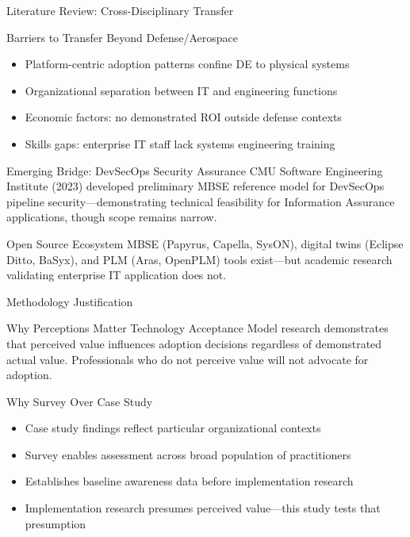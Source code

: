 \documentclass{beamer}
\begin{document}
\begin{frame}[allowframebreaks]{Literature Review: Cross-Disciplinary Transfer}
  \begin{block}{Barriers to Transfer Beyond Defense/Aerospace}
    \begin{itemize}
      \item Platform-centric adoption patterns confine DE to physical systems
      \item Organizational separation between IT and engineering functions
      \item Economic factors: no demonstrated ROI outside defense contexts
      \item Skills gaps: enterprise IT staff lack systems engineering training
    \end{itemize}
  \end{block}

  \begin{block}{Emerging Bridge: DevSecOps Security Assurance}
    CMU Software Engineering Institute (2023) developed preliminary MBSE reference model for DevSecOps pipeline security---demonstrating technical feasibility for Information Assurance applications, though scope remains narrow.
  \end{block}

  \begin{block}{Open Source Ecosystem}
    MBSE (Papyrus, Capella, SysON), digital twins (Eclipse Ditto, BaSyx), and PLM (Aras, OpenPLM) tools exist---but academic research validating enterprise IT application does not.
  \end{block}
\end{frame}

\begin{frame}[allowframebreaks]{Methodology Justification}
  \begin{block}{Why Perceptions Matter}
    Technology Acceptance Model research demonstrates that perceived value influences adoption decisions regardless of demonstrated actual value. Professionals who do not perceive value will not advocate for adoption.
  \end{block}

  \begin{block}{Why Survey Over Case Study}
    \begin{itemize}
      \item Case study findings reflect particular organizational contexts
      \item Survey enables assessment across broad population of practitioners
      \item Establishes baseline awareness data before implementation research
      \item Implementation research presumes perceived value---this study tests that presumption
    \end{itemize}
  \end{block}
\end{frame}
\end{document}
